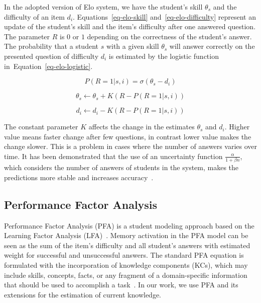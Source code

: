 In the adopted version of Elo system, we have the student's skill $\theta_s$ and the difficulty of an item $d_i$. Equations~\ref{eq-elo-skill} and~\ref{eq-elo-difficulty} represent an update of the student's skill and the item's difficulty after one answered question. The parameter $R$ is $0$ or $1$ depending on the correctness of the student's answer. The probability that a student $s$ with a given skill $\theta_s$ will answer correctly on the presented question of difficulty $d_i$ is estimated by the logistic function in~Equation~\ref{eq-elo-logistic}.

\begin{equation} \label{eq-elo-logistic}
  P(R = 1|s,i) = \sigma(\theta_s - d_i)
\end{equation}

\begin{equation} \label{eq-elo-skill}
  \theta_s \gets \theta_s + K(R - P(R = 1|s,i))
\end{equation}

\begin{equation} \label{eq-elo-difficulty}
  d_i \gets d_i - K(R - P(R = 1|s,i))
\end{equation}

The constant parameter $K$ affects the change in the estimates $\theta_s$ and $d_i$. Higher value means faster change after few questions, in contrast lower value makes the change slower. This is a problem in cases where the number of answers varies over time. It has been demonstrated that the use of an uncertainty function $\frac{\alpha}{1 + \beta n}$, which considers the number of answers of students in the system, makes the predictions more stable and increases accuracy~\cite{Vanek2014}.

\subsection{Performance Factor Analysis}
\label{pfa}

Performance Factor Analysis (PFA) is a student modeling approach based on the Learning Factor Analysis (LFA)~\cite{Pavlik2009,cen2007over}. Memory activation in the PFA model can be seen as the sum of the item's difficulty and all student's answers with estimated weight for successful and unsuccessful answers. The standard PFA equation is formulated with the incorporation of knowledge components (KCs), which may include skills, concepts, facts, or any fragment of a domain-specific information that should be used to accomplish a task~\cite{vanlehn2006}. In our work, we use PFA and its extensions for the estimation of current knowledge.


